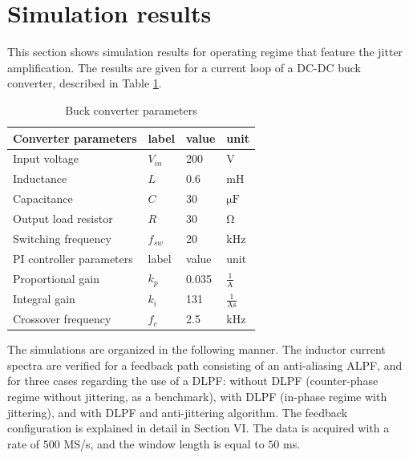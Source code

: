 \documentclass[journal]{IEEEtran}
\begin{document}
\section{Simulation results}

This section shows simulation results for operating regime that feature the jitter amplification. The results are given for a current loop of a DC-DC buck converter, described in Table \ref{tab: Converter}. 

\begin{table}[h!]
			  \caption{Buck converter parameters}
              \label{tab: Converter}
              \centering
              \begin{tabular}{llll}
                           \midrule\midrule
        Converter parameters     & label           & value             & unit\\
        \midrule               
                  Input voltage   	& $V_{in}$      & 200    & V\\  
                  Inductance    & $L$      & 0.6    & mH\\
                  Capacitance    & $C$      & 30    & $\mathrm{\mu F}$\\
                  Output load resistor    & $R$      & 30    & \si{\ohm}\\
                  Switching frequency    & $f_{sw}$      & 20    & kHz\\
                  \midrule\midrule
        PI controller parameters & label           & value             & unit\\
                  \midrule
                  Proportional gain    & $k_p$      & 0.035    & $\mathrm{\frac{1}{A}}$\\
                  Integral gain    & $k_i$    & 131    & $\mathrm{\frac{1}{As}}$\\        
                  Crossover frequency    & $f_c$    & 2.5    & kHz\\                                                         
                  \midrule\midrule
              \end{tabular}
\end{table}

The simulations are organized in the following manner. The inductor current spectra are verified for a feedback path consisting of an anti-aliasing ALPF, and for three cases regarding the use of a DLPF: without DLPF (counter-phase regime without jittering, as a benchmark), with DLPF (in-phase regime with jittering), and with DLPF and anti-jittering algorithm. The feedback configuration is explained in detail in Section VI. The data is acquired with a rate of $500$ MS/s, and the window length is equal to $50$ ms.
\end{document}
